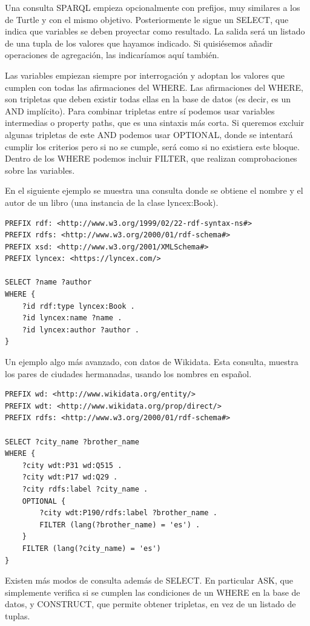 \documentclass[12pt]{report} %
\begin{document}
Una consulta SPARQL empieza opcionalmente con prefijos, muy similares a los de Turtle y con el mismo objetivo. Posteriormente le sigue un SELECT, que indica que variables se deben proyectar como resultado. La salida será un listado de una tupla de los valores que hayamos indicado. Si quisiésemos añadir operaciones de agregación, las indicaríamos aquí también.

Las variables empiezan siempre por interrogación y adoptan los valores que cumplen con todas las afirmaciones del WHERE. Las afirmaciones del WHERE, son tripletas que deben existir todas ellas en la base de datos (es decir, es un AND implícito). Para combinar tripletas entre sí podemos usar variables intermedias o property paths, que es una sintaxis más corta. Si queremos excluir algunas tripletas de este AND podemos usar OPTIONAL, donde se intentará cumplir los criterios pero si no se cumple, será como si no existiera este bloque. Dentro de los WHERE podemos incluir FILTER, que realizan comprobaciones sobre las variables.

En el siguiente ejemplo se muestra una consulta donde se obtiene el nombre y el autor de un libro (una instancia de la clase lyncex:Book).

\begin{lstlisting}
PREFIX rdf: <http://www.w3.org/1999/02/22-rdf-syntax-ns#>
PREFIX rdfs: <http://www.w3.org/2000/01/rdf-schema#>
PREFIX xsd: <http://www.w3.org/2001/XMLSchema#>
PREFIX lyncex: <https://lyncex.com/>

SELECT ?name ?author
WHERE {
    ?id rdf:type lyncex:Book .
    ?id lyncex:name ?name .
    ?id lyncex:author ?author .
}
\end{lstlisting}

Un ejemplo algo más avanzado, con datos de Wikidata. Esta consulta, muestra los pares de ciudades hermanadas, usando los nombres en español.

\begin{lstlisting}
PREFIX wd: <http://www.wikidata.org/entity/>
PREFIX wdt: <http://www.wikidata.org/prop/direct/>
PREFIX rdfs: <http://www.w3.org/2000/01/rdf-schema#>

SELECT ?city_name ?brother_name
WHERE {
    ?city wdt:P31 wd:Q515 .
    ?city wdt:P17 wd:Q29 .
    ?city rdfs:label ?city_name .
    OPTIONAL {
        ?city wdt:P190/rdfs:label ?brother_name .
        FILTER (lang(?brother_name) = 'es') .
    }
    FILTER (lang(?city_name) = 'es')
}
\end{lstlisting}

Existen más modos de consulta además de SELECT. En particular ASK, que simplemente verifica si se cumplen las condiciones de un WHERE en la base de datos, y CONSTRUCT, que permite obtener tripletas, en vez de un listado de tuplas.
\end{document}
